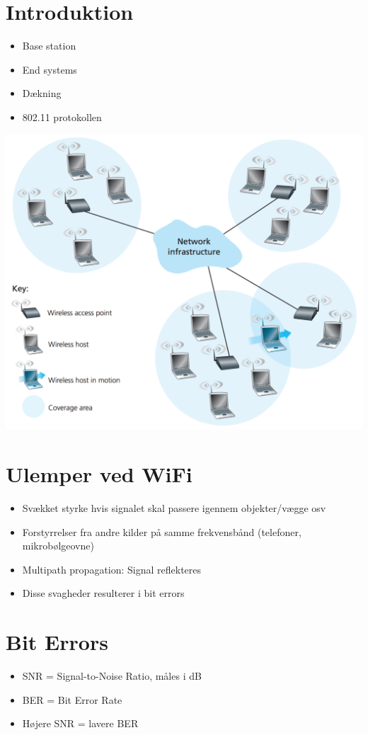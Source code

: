 \section{Introduktion}
\begin{itemize}
	\item Base station
	\item End systems
	\item Dækning
	\item 802.11 protokollen
\end{itemize}

\includegraphics[scale=0.6]{6-wireless/wireless-network.png}

\section{Ulemper ved WiFi}
\begin{itemize}
	\item Svækket styrke hvis signalet skal passere igennem objekter/vægge osv
	\item Forstyrrelser fra andre kilder på samme frekvensbånd (telefoner, mikrobølgeovne)
	\item Multipath propagation: Signal reflekteres 
	\item Disse svagheder resulterer i bit errors
\end{itemize}

\section{Bit Errors}
\begin{itemize}
	\item SNR = Signal-to-Noise Ratio, måles i dB
	\item BER = Bit Error Rate
	\item Højere SNR = lavere BER
\end{itemize}

